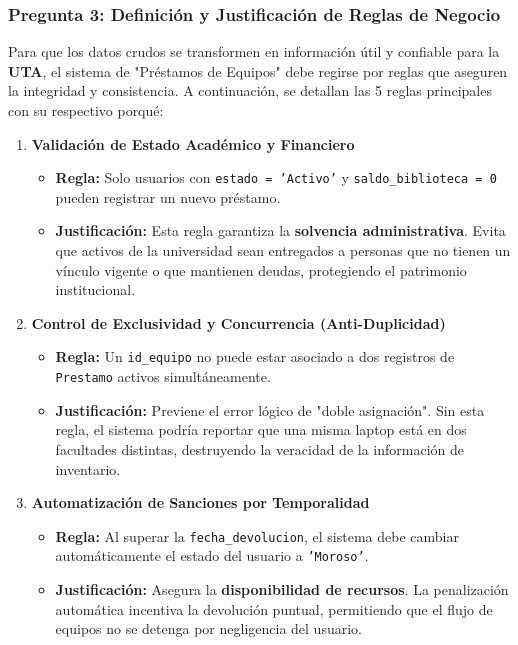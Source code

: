 \documentclass{article}
\begin{document}
\subsubsection{Pregunta 3: Definición y Justificación de Reglas de Negocio}

Para que los datos crudos se transformen en información útil y confiable para la \textbf{UTA}, el sistema de "Préstamos de Equipos" debe regirse por reglas que aseguren la integridad y consistencia. A continuación, se detallan las 5 reglas principales con su respectivo porqué:

\begin{enumerate}
    \item \textbf{Validación de Estado Académico y Financiero}
    \begin{itemize}
        \item \textbf{Regla:} Solo usuarios con \texttt{estado = 'Activo'} y \texttt{saldo\_biblioteca = 0} pueden registrar un nuevo préstamo.
        \item \textbf{Justificación:} Esta regla garantiza la \textbf{solvencia administrativa}. Evita que activos de la universidad sean entregados a personas que no tienen un vínculo vigente o que mantienen deudas, protegiendo el patrimonio institucional.
    \end{itemize}

    \item \textbf{Control de Exclusividad y Concurrencia (Anti-Duplicidad)}
    \begin{itemize}
        \item \textbf{Regla:} Un \texttt{id\_equipo} no puede estar asociado a dos registros de \texttt{Prestamo} activos simultáneamente.
        \item \textbf{Justificación:} Previene el error lógico de "doble asignación". Sin esta regla, el sistema podría reportar que una misma laptop está en dos facultades distintas, destruyendo la veracidad de la información de inventario.
    \end{itemize}

    \item \textbf{Automatización de Sanciones por Temporalidad}
    \begin{itemize}
        \item \textbf{Regla:} Al superar la \texttt{fecha\_devolucion}, el sistema debe cambiar automáticamente el estado del usuario a \texttt{'Moroso'}.
        \item \textbf{Justificación:} Asegura la \textbf{disponibilidad de recursos}. La penalización automática incentiva la devolución puntual, permitiendo que el flujo de equipos no se detenga por negligencia del usuario.
    \end{itemize}


\end{enumerate}
\end{document}
